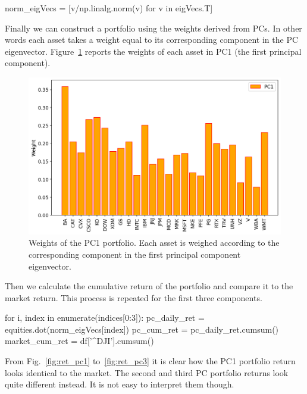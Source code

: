 \begin{ipython}
norm_eigVecs = [v/np.linalg.norm(v) for v in eigVecs.T]
\end{ipython}
	
Finally we can construct a portfolio using the weights derived from PCs. In other words each asset takes a weight equal to its corresponding component in the PC eigenvector. Figure~\ref{fig:pca_weights} reports the weights of each asset in PC1 (the first principal component).
	
\begin{figure}[htb]
	\centering
	\includegraphics[width=.7\textwidth]{figures/portfolio_pca_pc1_weights}
	\caption{Weights of the PC1 portfolio. Each asset is weighed according to the corresponding component in the first principal component eigenvector.}
	\label{fig:pca_weights}
\end{figure}
	
Then we calculate the cumulative return of the portfolio and compare it to the market return. This process is repeated for the first three components.

\begin{ipython}
for i, index in enumerate(indices[0:3]):
    pc_daily_ret = equities.dot(norm_eigVecs[index])
    pc_cum_ret = pc_daily_ret.cumsum()
    market_cum_ret = df['^DJI'].cumsum()
\end{ipython}
	
From Fig.~\ref{fig:ret_pc1} to~\ref{fig:ret_pc3} it is clear how the PC1 portfolio return looks identical to the market. The second and third PC portfolio returns look quite different instead. It is not easy to interpret them though. 

